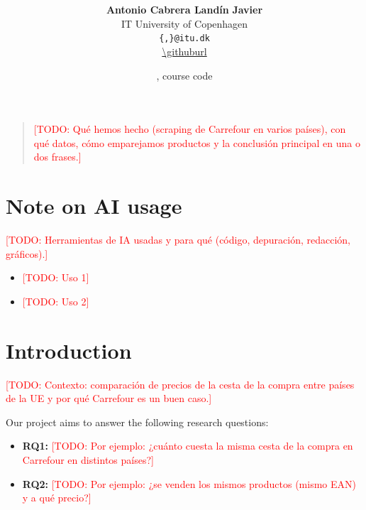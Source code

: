 \documentclass[11pt,a4paper,twocolumn]{article}
\title{\textbf{\reporttitle}}
\author{
    \textbf{Antonio Cabrera Landín} \quad \textbf{Javier \todo{apellidos}} \quad \textbf{\todo{resto del grupo}} \\
    IT University of Copenhagen \\
    \texttt{\{\todo{email},\todo{email}\}@itu.dk} \\
    \url{\githuburl}
}
\date{\small \coursename, course code \coursecode}
\newcommand{\todo}[1]{\textcolor{red}{[TODO: #1]}}
\renewenvironment{abstract}
    {\begin{center}\bfseries\abstractname\end{center}\vspace{-0.5\baselineskip}\begin{quote}\small}
    {\end{quote}}
\begin{document}
\maketitle

\begin{abstract}
    \todo{Qué hemos hecho (scraping de Carrefour en varios países), con qué datos, cómo emparejamos productos y la conclusión principal en una o dos frases.}
\end{abstract}

\section{Note on AI usage}
\todo{Herramientas de IA usadas y para qué (código, depuración, redacción, gráficos).}

\begin{itemize}
    \item \todo{Uso 1}
    \item \todo{Uso 2}
\end{itemize}

\section{Introduction}
\todo{Contexto: comparación de precios de la cesta de la compra entre países de la UE y por qué Carrefour es un buen caso.}

Our project aims to answer the following research questions:
\begin{itemize}
    \item \textbf{RQ1:} \todo{Por ejemplo: ¿cuánto cuesta la misma cesta de la compra en Carrefour en distintos países?}
    \item \textbf{RQ2:} \todo{Por ejemplo: ¿se venden los mismos productos (mismo EAN) y a qué precio?}
\end{itemize}
\end{document}
